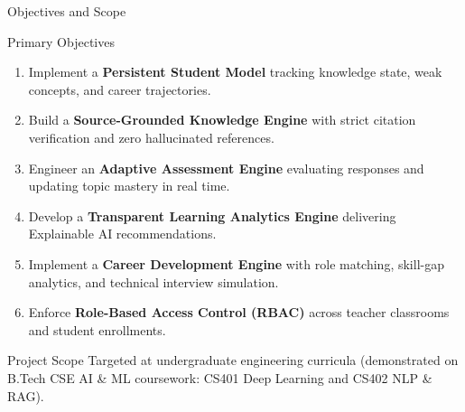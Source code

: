 \documentclass[aspectratio=169,10pt]{beamer}
\begin{document}
\begin{frame}{Objectives and Scope}
  \begin{block}{Primary Objectives}
    \begin{enumerate}
      \item Implement a \textbf{Persistent Student Model} tracking knowledge state, weak concepts, and career trajectories.
      \item Build a \textbf{Source-Grounded Knowledge Engine} with strict citation verification and zero hallucinated references.
      \item Engineer an \textbf{Adaptive Assessment Engine} evaluating responses and updating topic mastery in real time.
      \item Develop a \textbf{Transparent Learning Analytics Engine} delivering Explainable AI recommendations.
      \item Implement a \textbf{Career Development Engine} with role matching, skill-gap analytics, and technical interview simulation.
      \item Enforce \textbf{Role-Based Access Control (RBAC)} across teacher classrooms and student enrollments.
    \end{enumerate}
  \end{block}
  \begin{exampleblock}{Project Scope}
    Targeted at undergraduate engineering curricula (demonstrated on B.Tech CSE AI \& ML coursework: CS401 Deep Learning and CS402 NLP \& RAG).
  \end{exampleblock}
\end{frame}
\end{document}
